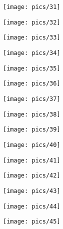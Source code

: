 \documentclass[a4paper,10pt]{article}
\begin{document}
\begin{center}
    \texttt{[image: pics/31]}
\vspace{1em}



    \texttt{[image: pics/32]}
\vspace{1em}



    \texttt{[image: pics/33]}
\vspace{1em}



    \texttt{[image: pics/34]}
\vspace{1em}



    \texttt{[image: pics/35]}
\vspace{1em}



    \texttt{[image: pics/36]}
\vspace{1em}



    \texttt{[image: pics/37]}
\vspace{1em}



    \texttt{[image: pics/38]}
\vspace{1em}



    \texttt{[image: pics/39]}
\vspace{1em}



    \texttt{[image: pics/40]}
\vspace{1em}



    \texttt{[image: pics/41]}
\vspace{1em}



    \texttt{[image: pics/42]}
\vspace{1em}



    \texttt{[image: pics/43]}
\vspace{1em}



    \texttt{[image: pics/44]}
\vspace{1em}



    \texttt{[image: pics/45]}
\vspace{1em}




\end{center}
\end{document}
